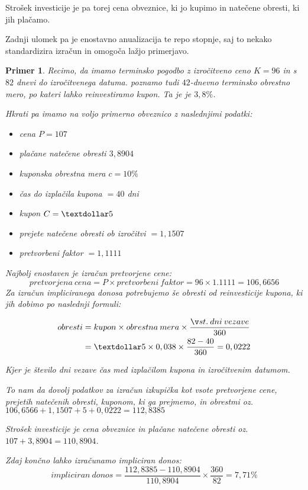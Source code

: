 \documentclass[a4paper, 11pt]{article}
\newtheorem{primer}{Primer}
\begin{document}
Strošek investicije je pa torej cena obveznice, ki jo kupimo in natečene obresti, ki jih plačamo.

Zadnji ulomek pa je enostavno anualizacija te repo stopnje, saj to nekako standardizira izračun
in omogoča lažjo primerjavo. 

\begin{primer}
    Recimo, da imamo terminsko pogodbo z izročitveno ceno $K = 96$ in s $82$ dnevi do izročitvenega
    datuma. poznamo tudi $42$-dnevno terminsko obrestno mero, po kateri lahko reinvestiramo kupon.
    Ta je je $3,8\%$.

    Hkrati pa imamo na voljo primerno obveznico z naslednjimi podatki:

    \begin{itemize}
        \item cena $P = 107$
        \item plačane natečene obresti $3,8904$
        \item kuponska obrestna mera $c = 10\%$
        \item čas do izplačila kupona $ = 40$ dni
        \item kupon $C = \textdollar5$
        \item prejete natečene obresti ob izročitvi $ = 1,1507$
        \item pretvorbeni faktor $ = 1,1111$
    \end{itemize}

    Najbolj enostaven je izračun pretvorjene cene:
    $$ pretvorjena\:cena = P \times pretvorbeni\:faktor = 96 \times 1.1111 = 106,6656 $$
    Za izračun impliciranega donosa potrebujemo še obresti od reinvesticije kupona, ki jih
    dobimo po naslednji formuli:
    
    \begin{align*}
        obresti
        &= kupon \times obrestna\:mera \times \frac{št.\:dni\:vezave}{360} \\
        &= \textdollar5 \times 0,038 \times \frac{82 - 40}{360} = 0,0222 
    \end{align*}

    Kjer je število dni vezave čas med izplačilom kupona in izročitvenim datumom. 

    To nam da dovolj podatkov za izračun izkupička kot vsote pretvorjene cene, prejetih natečenih
    obresti, kuponom, ki ga prejmemo, in obrestmi oz. $106,6566 + 1,1507 + 5 + 0,0222 = 112,8385$

    Strošek investicije je cena obveznice in plačane natečene obresti oz. $107 + 3,8904 = 110,8904$.

    Zdaj končno lahko izračunamo impliciran donos:
    $$ impliciran\:donos = \frac{112,8385 - 110,8904}{110,8904} \times \frac{360}{82} 
    = 7,71\% $$
    
\end{primer}
\end{document}

